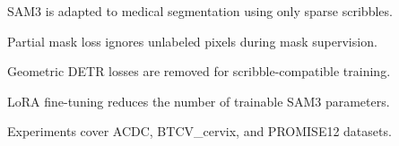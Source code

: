 \begin{highlights}
\item SAM3 is adapted to medical segmentation using only sparse scribbles.
\item Partial mask loss ignores unlabeled pixels during mask supervision.
\item Geometric DETR losses are removed for scribble-compatible training.
\item LoRA fine-tuning reduces the number of trainable SAM3 parameters.
\item Experiments cover ACDC, BTCV\_cervix, and PROMISE12 datasets.
\end{highlights}
